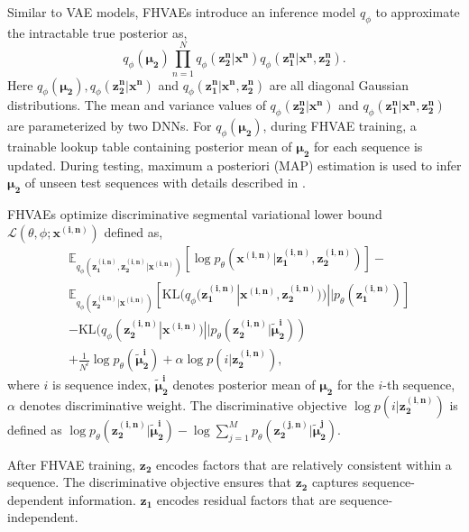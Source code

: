 \documentclass[a4paper]{article}
\begin{document}
Similar to VAE models, FHVAEs introduce an inference model $q_{\phi}$
to approximate the intractable  true posterior as,
\begin{equation}
   q_{\phi} (\bm{\mu_2})\prod_{n=1}^{N}q_{\phi} (\bm{z_2^n}| \bm{x^n}) q_{\phi}(\bm{z_1^n}|\bm{x^n}, \bm{z_2^n}).
   \label{eqt:inference}
\end{equation}
Here  $q_{\phi} (\bm{\mu_2}), q_{\phi} (\bm{z_2^n}| \bm{x^n})$ and $q_{\phi}(\bm{z_1^n}|\bm{x^n}, \bm{z_2^n})$ are all diagonal Gaussian distributions. The mean and variance values of $q_{\phi} (\bm{z_2^n}| \bm{x^n})$ and $q_{\phi}(\bm{z_1^n}|\bm{x^n}, \bm{z_2^n})$ are parameterized by two DNNs. For $q_{\phi} (\bm{\mu_2})$, during FHVAE training, a trainable lookup table containing posterior mean of $\bm{\mu_2}$ for each sequence is updated.
During testing, maximum a posteriori (MAP) estimation is used to infer  $\bm{\mu_2}$ of unseen test sequences with details described in \cite{hsu2017nips}.

FHVAEs optimize discriminative segmental variational lower bound $\mathcal{L} (\theta, \phi; \bm{x^{(i,n)}})$ defined as,
\begin{align*}
&\mathbb{E}_{q_{\phi} (\bm{z_1^{(i,n)}},\bm{z_2^{(i,n)}}|\bm{x^{(i,n)}} )} [\log p_{\theta} (\bm{x^{(i,n)}}|\bm{z_1^{(i,n)}}, \bm{z_2^{(i,n)}})] -\\
& \mathbb{E}_{q_{\phi}(\bm{z_2^{(i,n)}} |\bm{x^{(i,n)}} )} [\mathrm{KL} (q_{\phi} (\bm{z_1^{(i,n)}}|\bm{x^{(i,n)}}, \bm{z_2^{(i,n)}}))||p_{\theta} (\bm{z_1^{(i,n)}})]\\
&-\mathrm{KL} (q_{\phi}(\bm{z_2 ^{(i,n)}}|\bm{x^{(i,n)}})|| p_{\theta}(\bm{z_2 ^{(i,n)}}| \bm{\tilde{\mu}_2^i})) \\
&+\frac{1}{N^i}\log p_{\theta} (\bm{\tilde{\mu}_2^i}) + \alpha \log p(i| \bm{z_2^{(i,n)}}),
\end{align*}
where $i$ is sequence index, $\bm{\tilde{\mu}_2^{i}}$ denotes posterior mean of $\bm{\mu_2}$ for the $i$-th sequence, $\alpha$ denotes discriminative weight. The discriminative objective $\log p(i| \bm{z_2^{(i,n)}}) $ is defined as $\log p_{\theta} (\bm{z_2^{(i,n)}}| \bm{\tilde{\mu}_2^i})-\log \sum_{j=1}^{M}p_{\theta} (\bm{z_2^{(j,n)}}| \bm{\tilde{\mu}_2^j})$.

After FHVAE training, $\bm{z_2}$ encodes factors that are relatively consistent within a sequence.
The discriminative objective ensures that $\bm{z_2}$ captures sequence-dependent information. $\bm{z_1}$ encodes residual factors that are sequence-independent.
\end{document}
